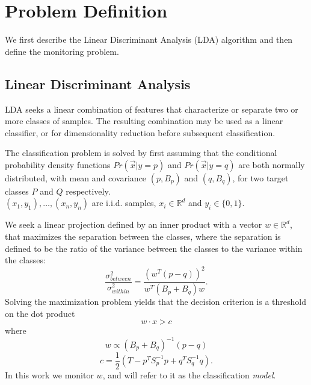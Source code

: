 \section{Problem Definition}
We first describe the Linear Discriminant Analysis (LDA) algorithm and then define the monitoring problem. 

\subsection{Linear Discriminant Analysis}%
LDA seeks a linear combination of features that characterize or separate two or more classes of samples.
The resulting combination may be used as a linear classifier, or for dimensionality reduction before subsequent classification.

The classification problem is solved by first assuming that the conditional probability
density functions $Pr(\vec x|y=p)$ and $Pr(\vec x|y=q)$ are both normally distributed, with
mean and covariance  $(p, B_p)$ and
$(q, B_q)$, for two target classes $P$ and $Q$ respectively.\\
${(x_1,y_1),\ldots,(x_n,y_n)}$ are i.i.d. samples, $x_i \in \mathbb{R}^d$
and $y_i \in \{0,1\}$.

We seek a linear projection defined by an inner product with a vector $w \in \mathbb{R}^d $,
that maximizes the separation between the classes, where the separation is
defined to be the ratio of the variance between the classes to the variance
within the classes:
\begin{equation}
\frac{\sigma^2_{between}}{\sigma^2_{within}} = \frac{(w^T (p -
q))^2}{w^T(B_p+B_q)w}.
\end{equation}
Solving the maximization problem yields that the decision criterion is a threshold on the
dot product
\begin{equation*} \label{eq:decision}
w \cdot x > c
\end{equation*}
where
\begin{equation} \label{eq:w}
w \propto (B_p+B_q)^{-1}(p - q)
\end{equation}
\begin{equation} \label{eq:c}
c = \frac{1}{2}(T-{p}^T S_p^{-1} {p}+{q}^T S_q^{-1} {q}).
\end{equation}
In this work we monitor $w$, and will refer to it as the classification \textit{model}.

